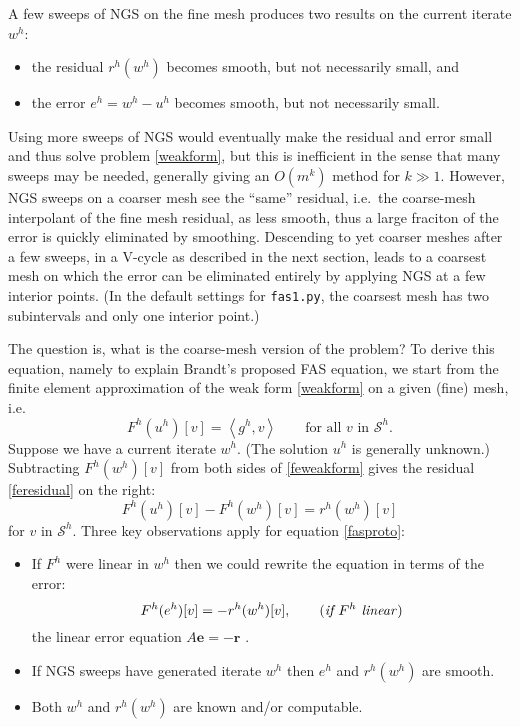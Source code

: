 \documentclass[letterpaper,final,12pt,reqno]{amsart}
\newcommand{\be}{\mathbf{e}}
\newcommand{\br}{\mathbf{r}}
\newcommand{\ip}[2]{\left<#1,#2\right>}
\begin{document}
A few sweeps of NGS on the fine mesh produces two results on the current iterate $w^h$:
\begin{itemize}
\item the residual $r^h(w^h)$ becomes smooth, but not necessarily small, and
\item the error $e^h = w^h - u^h$ becomes smooth, but not necessarily small.
\end{itemize}

Using more sweeps of NGS would eventually make the residual and error small and thus solve problem \eqref{weakform}, but this is inefficient in the sense that many sweeps may be needed, generally giving an $O(m^k)$ method for $k\gg 1$.  However, NGS sweeps on a coarser mesh see the ``same'' residual, i.e.~the coarse-mesh interpolant of the fine mesh residual, as less smooth, thus a large fraciton of the error is quickly eliminated by smoothing.  Descending to yet coarser meshes after a few sweeps, in a V-cycle as described in the next section, leads to a coarsest mesh on which the error can be eliminated entirely by applying NGS at a few interior points.  (In the default settings for \texttt{fas1.py}, the coarsest mesh has two subintervals and only one interior point.)

The question is, what is the coarse-mesh version of the problem?  To derive this equation, namely to explain Brandt's proposed FAS equation, we start from the finite element approximation of the weak form \eqref{weakform} on a given (fine) mesh, i.e.
\begin{equation}
  F^h(u^h)[v] = \ip{g^h}{v} \qquad \text{for all } v \text{ in } \mathcal{S}^h.  \label{feweakform}
\end{equation}
Suppose we have a current iterate $w^h$.  (The solution $u^h$ is generally unknown.)  Subtracting $F^h(w^h)[v]$ from both sides of \eqref{feweakform} gives the residual \eqref{feresidual} on the right:
\begin{equation}
  F^h(u^h)[v] - F^h(w^h)[v] = r^h(w^h)[v] \label{fasproto}
\end{equation}
for $v$ in $\mathcal{S}^h$.  Three key observations apply for equation \eqref{fasproto}:
\begin{itemize}
\item If $F^h$ were linear in $w^h$ then we could rewrite the equation in terms of the error:
    $$F^h(e^h)[v] = -r^h(w^h)[v], \qquad (\text{\emph{if $F^h$ linear}})$$
the linear error equation $A\be=-\br$ \cite[Chapter 2]{Bueler2021}.
\item If NGS sweeps have generated iterate $w^h$ then $e^h$ and $r^h(w^h)$ are smooth.
\item Both $w^h$ and $r^h(w^h)$ are known and/or computable.
\end{itemize}
\end{document}
